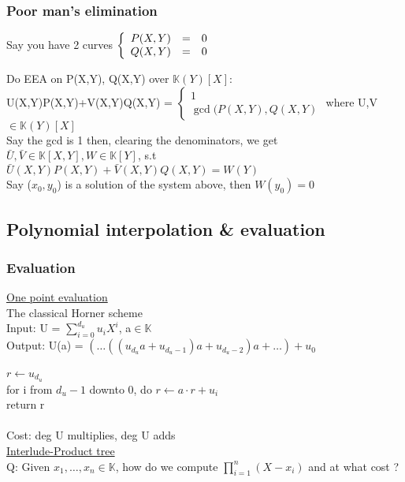 \documentclass{article}
\theoremstyle{definition}
\theoremstyle{remark}
\newcommand{\K}{\mathbb{K}}
\begin{document}
\subsubsection{Poor man's elimination}
Say you have 2 curves $\left\{\begin{array}{r c l}
P(X,Y) & = & 0\\
Q(X,Y) & = & 0
\end{array}\right.$

Do EEA on P(X,Y), Q(X,Y) over $\K(Y)[X]$:\\
U(X,Y)P(X,Y)+V(X,Y)Q(X,Y) = $\left\{\begin{array}{l}
1\\
\gcd(P(X,Y),Q(X,Y)
\end{array}\right.$ where U,V $\in \K(Y)[X]$\\
Say the gcd is 1 then, clearing the denominators, we get $\bar{U},\bar{V}\in\K[X,Y],W\in\K[Y]$, s.t\\
$\bar{U}(X,Y)P(X,Y)+\bar{V}(X,Y)Q(X,Y) = W(Y)$\\

Say ($x_0,y_0$) is a solution of the system above, then $W(y_0) = 0$

\subsection{Polynomial interpolation \& evaluation}
\subsubsection{Evaluation}
\underline{One point evaluation}\\

The classical Horner scheme\\
Input: U = $\sum_{i=0}^{d_u} u_iX^i$, a$\in\K$\\
Output: U(a) = $(\dots((u_{d_u}a+u_{d_u-1})a + u_{d_u-2})a+\dots)+u_0$\\\\
$r \leftarrow u_{d_u}$\\
for i from $d_u-1$ downto 0, do $r \leftarrow a\cdot r+u_i$\\
return r\\\\

Cost: deg U multiplies, deg U adds\\

\underline{Interlude-Product tree}\\
Q: Given $x_1,\dots,x_n \in\K$, how do we compute $\prod\limits_{i=1}^{n}(X-x_i)$ and at what cost ?\\\\
\end{document}
